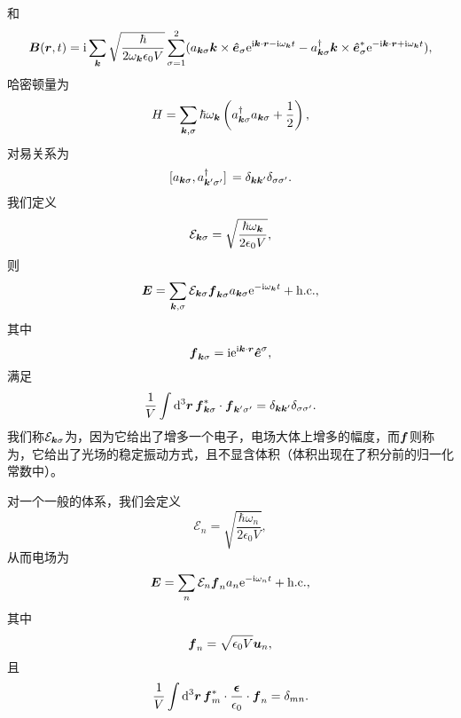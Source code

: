 和
\begin{equation}
    \vb*{B}(\vb*{r}, t) = \mathrm{i} \sum_{\vb*{k}} \sqrt{\frac{\hbar}{2 \omega_{\vb*{k}} \epsilon_0 V}} \sum_{\sigma=1}^2 (a_{\vb*{k} \sigma} \vb*{k} \times \vu*{e}_\sigma \mathrm{e}^{\mathrm{i} \vb*{k} \cdot \vb*{r} - \mathrm{i} \omega_{\vb*{k}} t} - a^\dagger_{\vb*{k} \sigma} \vb*{k} \times \vu*{e}_\sigma^* \mathrm{e}^{- \mathrm{i} \vb*{k} \cdot \vb*{r} + \mathrm{i} \omega_{\vb*{k}} t}),
    \label{eq:vacuum-b-field-cavity-1}
\end{equation}
哈密顿量为
\begin{equation}
    H = \sum_{\vb*{k}, \sigma} \hbar \omega_{\vb*{k}} \left( a^\dagger_{\vb*{k} \sigma} a_{\vb*{k} \sigma} + \frac{1}{2} \right),
\end{equation}
对易关系为
\begin{equation}
    \comm*{a_{\vb*{k} \sigma}}{a_{\vb*{k}' \sigma'}^\dagger} = \delta_{\vb*{k} \vb*{k}'} \delta_{\sigma \sigma'}.
\end{equation}
我们定义
\begin{equation}
    \mathcal{E}_{\vb*{k} \sigma} = \sqrt{\frac{\hbar \omega_{\vb*{k}}}{2 \epsilon_0 V}},
\end{equation}
则
\begin{equation}
    \vb*{E} = \sum_{\vb*{k}, \sigma} \mathcal{E}_{\vb*{k} \sigma} \vb*{f}_{\vb*{k} \sigma} a_{\vb*{k} \sigma} \mathrm{e}^{- \mathrm{i} \omega_{\vb*{k}} t} + \text{h.c.},
\end{equation}
其中
\begin{equation}
    \vb*{f}_{\vb*{k} \sigma} = \mathrm{i} \mathrm{e}^{\mathrm{i} \vb*{k} \cdot \vb*{r}} \vu*{e}^\sigma,
\end{equation}
满足
\begin{equation}
    \frac{1}{V} \int \dd[3]{\vb*{r}} \vb*{f}^*_{\vb*{k} \sigma} \cdot \vb*{f}_{\vb*{k}' \sigma'} = \delta_{\vb*{k} \vb*{k}'} \delta_{\sigma \sigma'}.
\end{equation}
我们称$\mathcal{E}_{\vb*{k} \sigma}$为，因为它给出了增多一个电子，电场大体上增多的幅度，而$\vb*{f}$则称为，它给出了光场的稳定振动方式，且不显含体积（体积出现在了积分前的归一化常数中）。

对一个一般的体系，我们会定义
\begin{equation}
    \mathcal{E}_{n} = \sqrt{\frac{\hbar \omega_n}{2 \epsilon_0 V}},
\end{equation}
从而电场为
\begin{equation}
    \vb*{E} = \sum_n \mathcal{E}_n \vb*{f}_{n} a_n \mathrm{e}^{- \mathrm{i} \omega_n t} + \text{h.c.},
\end{equation}
其中
\begin{equation}
    \vb*{f}_n = \sqrt{\epsilon_0 V} \vb*{u}_n,
\end{equation}
且
\begin{equation}
    \frac{1}{V} \int \dd[3]{\vb*{r}} \vb*{f}_m^* \cdot \frac{\vb*{\epsilon}}{\epsilon_0} \cdot \vb*{f}_n = \delta_{mn}.
\end{equation}

